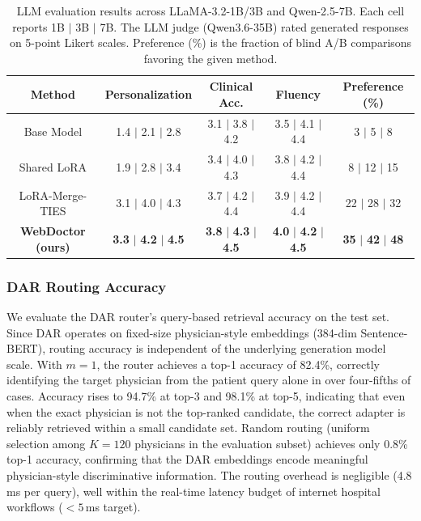 \begin{table}[!t]
\small
\setlength{\tabcolsep}{4pt}
\renewcommand\arraystretch{1.06}
\centering
\caption{LLM evaluation results across LLaMA-3.2-1B/3B and Qwen-2.5-7B. Each cell reports 1B $|$ 3B $|$ 7B. The LLM judge (Qwen3.6-35B) rated generated responses on 5-point Likert scales. Preference (\%) is the fraction of blind A/B comparisons favoring the given method.}
\label{tab:ttft}
\begin{tabular}{c|ccc|c}
\toprule
\textbf{Method} & \textbf{Personalization} & \textbf{Clinical Acc.} & \textbf{Fluency} & \textbf{Preference} (\%)\\
\midrule
Base Model & 1.4 $|$ 2.1 $|$ 2.8 & 3.1 $|$ 3.8 $|$ 4.2 & 3.5 $|$ 4.1 $|$ 4.4 & 3 $|$ 5 $|$ 8\\
Shared LoRA & 1.9 $|$ 2.8 $|$ 3.4 & 3.4 $|$ 4.0 $|$ 4.3 & 3.8 $|$ 4.2 $|$ 4.4 & 8 $|$ 12 $|$ 15\\
LoRA-Merge-TIES & 3.1 $|$ 4.0 $|$ 4.3 & 3.7 $|$ 4.2 $|$ 4.4 & 3.9 $|$ 4.2 $|$ 4.4 & 22 $|$ 28 $|$ 32\\
\midrule
\rowcolor{blue!5}
\textbf{WebDoctor (ours)} & \textbf{3.3} $|$ \textbf{4.2} $|$ \textbf{4.5} & \textbf{3.8} $|$ \textbf{4.3} $|$ \textbf{4.5} & \textbf{4.0} $|$ \textbf{4.2} $|$ \textbf{4.5} & \textbf{35} $|$ \textbf{42} $|$ \textbf{48}\\
\bottomrule
\end{tabular}
\end{table}

\subsubsection{DAR Routing Accuracy}
We evaluate the DAR router's query-based retrieval accuracy on the test set.
Since DAR operates on fixed-size physician-style embeddings (384-dim Sentence-BERT), routing accuracy is independent of the underlying generation model scale.
With $m=1$, the router achieves a top-1 accuracy of 82.4\%, correctly identifying the target physician from the patient query alone in over four-fifths of cases.
Accuracy rises to 94.7\% at top-3 and 98.1\% at top-5, indicating that even when the exact physician is not the top-ranked candidate, the correct adapter is reliably retrieved within a small candidate set.
Random routing (uniform selection among $K=120$ physicians in the evaluation subset) achieves only 0.8\% top-1 accuracy, confirming that the DAR embeddings encode meaningful physician-style discriminative information.
The routing overhead is negligible (4.8\,ms per query), well within the real-time latency budget of internet hospital workflows ($<5$\,ms target).


